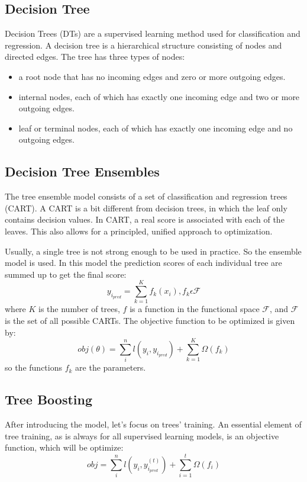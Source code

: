 \documentclass[a4paper, oneside]{book}
\begin{document}
			\subsection{Decision Tree}
			Decision Trees (DTs) are a supervised learning method used for classification and regression.
			\cite{Decision Tree}A decision tree is a hierarchical structure consisting of nodes and directed edges. The tree has three types of nodes:
			\begin{itemize}
				\item a root node that has no incoming edges and zero or more outgoing edges.
				\item internal nodes, each of which has exactly one incoming edge and two or more outgoing edges.
				\item leaf or terminal nodes, each of which has exactly one incoming edge and no outgoing edges.
			\end{itemize}
			
			\subsection{Decision Tree Ensembles}
			\cite{GBT}The tree ensemble model consists of a set of classification and regression trees (CART). A CART is a bit different from decision trees, in which the leaf only contains decision values. In CART, a real score is associated with each of the leaves. This also allows for a principled, unified approach to optimization.
			
			Usually, a single tree is not strong enough to be used in practice. So the ensemble model is used. In this model the prediction scores of each individual tree are summed up to get the final score:
			\begin{equation}
				y_{i_{pred}} = \sum_{k=1}^{K} f_k(x_i), f_k \epsilon \mathcal{F}
				\label{trees' sum}
			\end{equation}
			where $K$ is the number of trees, $f$ is a function in the functional space $\mathcal{F}$, and $\mathcal{F}$ is the set of all possible CARTs. The objective function to be optimized is given by:
			\begin{equation}
				obj(\theta) = \sum_{i}^{n}l(y_i,y_{i_{pred}}) + \sum_{k=1}^{K}\Omega(f_k)
				\label{obj ens}
			\end{equation}
			so the functions $f_k$ are the parameters.
			
			\subsection{Tree Boosting}
			After introducing the model, let's focus on trees' training. An essential element of tree training, as is always for all supervised learning models, is an objective function, which will be optimize:
			\begin{equation}
				obj = \sum_{i}^{n}l(y_i,y_{i_{pred}}^{(t)}) + \sum_{i=1}^{t}\Omega(f_i)
				\label{obj training}
			\end{equation}
			
\end{document}
